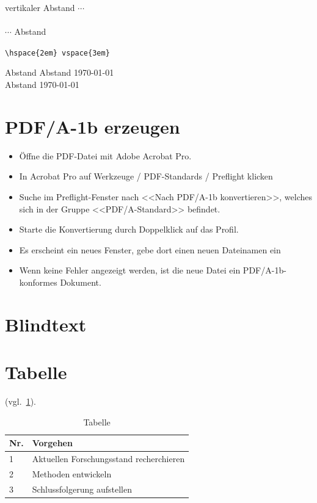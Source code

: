 vertikaler Abstand $\cdots$\\
\vspace{3em}\\
$\cdots$ Abstand

\verb|\hspace{2em} vspace{3em}|

Abstand
\vfill
Abstand \hfill \today\\
Abstand \hfil \today

\section{PDF/A-1b erzeugen}\label{labelname}

\begin{itemize}
	\item Öffne die PDF-Datei mit Adobe Acrobat Pro.
	\item In Acrobat Pro auf Werkzeuge / PDF-Standards / Preflight klicken
	\item Suche im Preflight-Fenster nach <<Nach PDF/A-1b konvertieren>>,
	welches sich in der Gruppe <<PDF/A-Standard>> befindet.
	\item Starte die Konvertierung durch Doppelklick auf das Profil.
	\item Es erscheint ein neues Fenster, gebe dort einen neuen Dateinamen ein
	\item Wenn keine Fehler angezeigt werden, ist die neue Datei ein PDF/A-1b-konformes Dokument.	
\end{itemize}

\clearpage
\section{Blindtext}
\blindtext

\blindtext

\clearpage
\section{Tabelle}

(vgl.~\ref{tab:tabelle}). 
\begin{table}[ht]%
	\centering
	\begin{tabular}{ll}%
		\toprule
		\textbf{Nr.} & \textbf{Vorgehen} \\
		\midrule
		1 & Aktuellen Forschungsstand recherchieren \\
		2 & Methoden entwickeln \\
		3 & Schlussfolgerung aufstellen \\
		\bottomrule
	\end{tabular}
	\caption{Tabelle}\label{tab:tabelle}%
\end{table}

